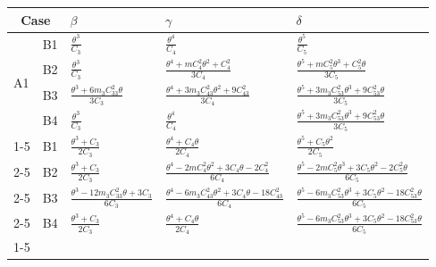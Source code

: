 \documentclass[table]{amsart}
\numberwithin{equation}{section}
\begin{document}
\begin{center}
\begin{longtable}[h!]{ |m{0.7cm}|m{0.7cm}|m{3.5cm}|m{4.7cm}|m{4.7cm}|} 
\hline
 \multicolumn{2}{|c|}{ Case } &  $\beta $ & $\gamma$ & $\delta$ \rule{0pt}{12pt} \\ \hline
 \multirow{4}{*}{A1}& B1 & $\frac{\theta^3}{C_3}$  & $\frac{\theta^4}{C_4}$ & $\frac{\theta^5}{C_5}$ \bigstrut \rule{0pt}{18pt} \\ \cline{2-5}
& B2 &$\frac{\theta^3}{C_3}$  & $\frac{\theta^4+mC_4^2\theta^2+C_4^2}{3C_4}$ & $\frac{\theta^5+mC_5^2\theta^3+C_5^2\theta}{3C_5}$ \bigstrut \rule{0pt}{18pt} \\ \cline{2-5}
& B3 & $\frac{\theta^3+6m_3C_{33}^2\theta}{3C_3}$  & $\frac{\theta^4+3m_3C_{43}^2\theta^2 + 9C_{43}^2}{3C_4}$ & $\frac{\theta^5+3m_3C_{53}^2\theta^3 + 9C_{53}^2\theta}{3C_5}$ \bigstrut \rule{0pt}{18pt} \\ \cline{2-5}
& B4 &  $\frac{\theta^3}{C_3}$  & $\frac{\theta^4}{C_4}$ & $\frac{\theta^5+3m_3C_{53}^2\theta^3 + 9C_{53}^2\theta}{3C_5}$ \bigstrut \rule{0pt}{18pt} \\ \cline{1-5}

\multirow{4}{*}{A2}& B1 & $\frac{\theta^3+C_3}{2C_3}$  &$\frac{\theta^4+C_4\theta}{2C_4}$ & $\frac{\theta^5+C_5\theta^2}{2C_5}$ \bigstrut \rule{0pt}{18pt} \\ \cline{2-5}
& B2 & $\frac{\theta^3+C_3}{2C_3}$  & $\frac{\theta^4-2mC_4^2\theta^2+3C_4\theta-2C_4^2}{6C_4}$ &$\frac{\theta^5-2mC_5^2\theta^3+3C_5\theta^2-2C_5^2\theta}{6C_5}$ \bigstrut \rule{0pt}{18pt} \\ \cline{2-5}
& B3 & $\frac{\theta^3-12m_3C_{33}^2\theta+3C_3}{6C_3}$  &$\frac{\theta^4-6m_3C_{43}^2\theta^2+3C_4\theta-18C_{43}^2}{6C_4}$ & $\frac{\theta^5-6m_3C_{53}^2\theta^3+3C_5\theta^2-18C_{53}^2\theta}{6C_5}$ \bigstrut \rule{0pt}{18pt} \\ \cline{2-5}
& B4 & $\frac{\theta^3+C_3}{2C_3}$  &$\frac{\theta^4+C_4\theta}{2C_4}$ &$\frac{\theta^5-6m_3C_{53}^2\theta^3+3C_5\theta^2-18C_{53}^2\theta}{6C_5}$ \bigstrut \rule{0pt}{18pt} \\ \cline{1-5}


\end{longtable}
\end{center}
\end{document}
